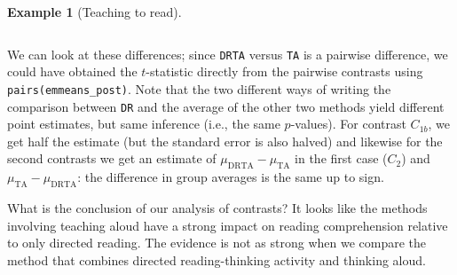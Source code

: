 \documentclass[
  11pt,
  letterpaper,
]{scrbook}
\theoremstyle{definition}
\theoremstyle{definition}
\newtheorem{example}{Example}[chapter]
\theoremstyle{remark}
\begin{document}
\begin{example}[Teaching to
read]
\begin{longtable}[t]{lrrrrr}
\end{longtable}

We can look at these differences; since \texttt{DRTA} versus \texttt{TA}
is a pairwise difference, we could have obtained the \(t\)-statistic
directly from the pairwise contrasts using
\texttt{pairs(emmeans\_post)}. Note that the two different ways of
writing the comparison between \texttt{DR} and the average of the other
two methods yield different point estimates, but same inference (i.e.,
the same \(p\)-values). For contrast \(C_{1b}\), we get half the
estimate (but the standard error is also halved) and likewise for the
second contrasts we get an estimate of
\(\mu_{\mathrm{DRTA}} - \mu_{\mathrm{TA}}\) in the first case (\(C_2\))
and \(\mu_{\mathrm{TA}} - \mu_{\mathrm{DRTA}}\): the difference in group
averages is the same up to sign.

What is the conclusion of our analysis of contrasts? It looks like the
methods involving teaching aloud have a strong impact on reading
comprehension relative to only directed reading. The evidence is not as
strong when we compare the method that combines directed
reading-thinking activity and thinking aloud.

\end{example}
\end{document}
